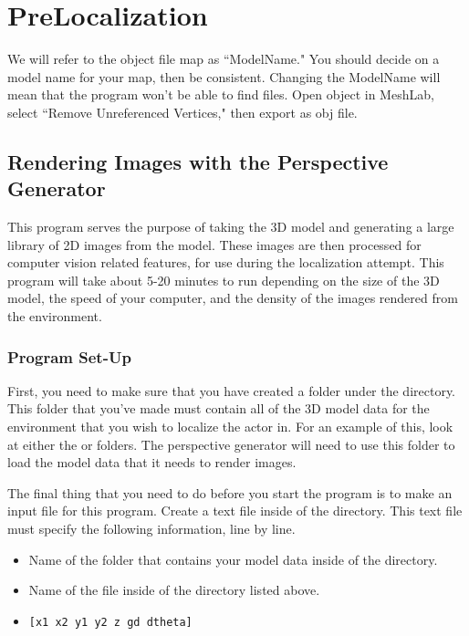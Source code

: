 \documentclass[11pt]{article}
\begin{document}
\section{PreLocalization}

We will refer to the object file map as ``ModelName." You should decide on a model name for your map, then be consistent. Changing the ModelName will mean that the program won't be able to find files. Open object in MeshLab, select ``Remove Unreferenced Vertices," then export as obj file.

\subsection{Rendering Images with the Perspective Generator}

This program serves the purpose of taking the 3D model and generating a large library of 2D images from the model. These images are then processed for computer vision related features, for use during the localization attempt. This program will take about 5-20 minutes to run depending on the size of the 3D model, the speed of your computer, and the density of the images rendered from the environment.

\subsubsection{Program Set-Up}
 First, you need to make sure that you have created a folder under the  directory. This folder that you've made must contain all of the 3D model data for the environment that you wish to localize the actor in. For an example of this, look at either the  or  folders. The perspective generator will need to use this folder to load the model data that it needs to render images. 
 
 The final thing that you need to do before you start the program is to make an input file for this program. Create a text file inside of the  directory. This text file must specify the following information, line by line.

 \begin{itemize}
 \item Name of the folder that contains your model data inside of the   directory.
 \item Name of the  file inside of the directory listed above.
 \item \texttt{[x1 x2 y1 y2 z gd dtheta]}
 \end{itemize}
\end{document}
